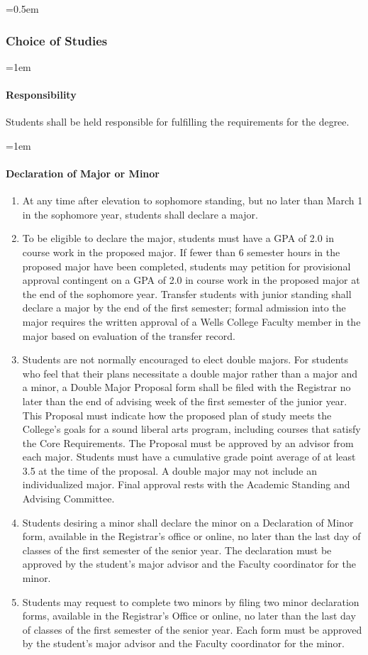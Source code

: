\documentclass{manual}
\let\oldsubsubsection\subsubsection
\renewcommand\subsubsection{\leftskip=0.5em\oldsubsubsection}
\let\oldparagraph\paragraph
\renewcommand\paragraph{\leftskip=1em\oldparagraph}
\newcommand{\itemLevelA}{\alph*.}
\newcommand{\itemRefA}{\alph*}
\begin{document}
\subsubsection{Choice of Studies}\label{sub:ChoiceOfStudies}

\paragraph{Responsibility}

Students shall be held responsible for fulfilling the requirements for the degree.

\paragraph{Declaration of Major or Minor}

	\begin{enumerate}[label=\itemLevelA,ref=\itemRefA]
	\item At any time after elevation to sophomore standing, but no later than March 1 in the sophomore year, students shall declare a major.
	\item To be eligible to declare the major, students must have a GPA of 2.0 in course work in the proposed major. If fewer than 6 semester hours in the proposed major have been completed, students may petition for provisional approval contingent on a GPA of 2.0 in course work in the proposed major at the end of the sophomore year. Transfer students with junior standing shall declare a major by the end of the first semester; formal admission into the major requires the written approval of a Wells College Faculty member in the major based on evaluation of the transfer record.
	\item Students are not normally encouraged to elect double majors. For students who feel  that their plans necessitate a double major rather than a major and a minor,  a Double Major Proposal form shall be filed with the Registrar no later than the end of advising week of the first semester of the junior year. This Proposal must indicate how the proposed plan of study meets the College's goals for a sound liberal arts program, including courses that satisfy the Core Requirements. The Proposal must be approved by an advisor from each major. Students must have a cumulative grade point average of at least 3.5 at the time of the proposal. A double major may not include an individualized major. Final approval rests with the Academic Standing and Advising Committee.
	\item Students desiring a minor shall declare the minor on a Declaration of Minor form, available in the Registrar's office or online, no later than the last day of classes of the first semester of the senior year. The declaration must be approved by the student's major advisor and the Faculty coordinator for the minor.
	\item Students may request to complete two minors by filing two minor declaration forms, available in the Registrar's Office or online, no later than the last day of classes of the first semester of the senior year. Each form must be approved by the student's major advisor and the Faculty coordinator for the minor.
	\end{enumerate}
\end{document}
